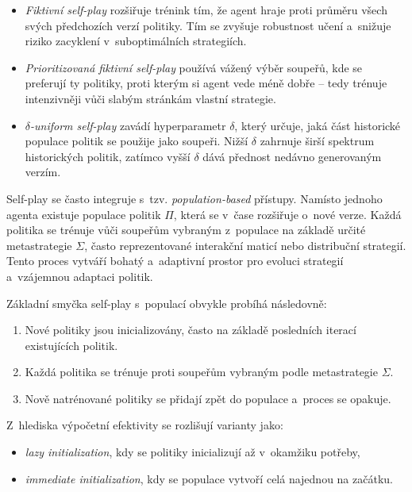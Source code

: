 \begin{itemize}
    \item \textit{Fiktivní self-play} rozšiřuje trénink tím, že agent hraje proti průměru všech svých 
    předchozích verzí politiky. Tím se zvyšuje robustnost učení a~snižuje riziko zacyklení v~suboptimálních strategiích.
    \item \textit{Prioritizovaná fiktivní self-play} používá vážený výběr soupeřů, kde se preferují ty 
    politiky, proti kterým si agent vede méně dobře – tedy trénuje intenzivněji vůči slabým stránkám vlastní strategie.
    \item \textit{$\delta$-uniform self-play} zavádí hyperparametr $\delta$, který určuje, jaká část 
    historické populace politik se použije jako soupeři. Nižší $\delta$ zahrnuje širší spektrum historických politik, 
    zatímco vyšší $\delta$ dává přednost nedávno generovaným verzím.
\end{itemize}

Self-play se často integruje s~tzv. \textit{population-based} přístupy. Namísto jednoho agenta existuje populace 
politik $\Pi$, která se v~čase rozšiřuje o~nové verze. Každá politika se trénuje vůči soupeřům vybraným z~populace 
na základě určité metastrategie $\Sigma$, často reprezentované interakční maticí nebo distribuční strategií. Tento 
proces vytváří bohatý a~adaptivní prostor pro evoluci strategií a~vzájemnou adaptaci politik.

Základní smyčka self-play s~populací obvykle probíhá následovně:

\begin{enumerate}
    \item Nové politiky jsou inicializovány, často na základě posledních iterací existujících politik.
    \item Každá politika se trénuje proti soupeřům vybraným podle metastrategie $\Sigma$.
    \item Nově natrénované politiky se přidají zpět do populace a~proces se opakuje.
\end{enumerate}

Z~hlediska výpočetní efektivity se rozlišují varianty jako:

\begin{itemize}
    \item \textit{lazy initialization}, kdy se politiky inicializují až v~okamžiku potřeby,
    \item \textit{immediate initialization}, kdy se populace vytvoří celá najednou na začátku.
\end{itemize}

